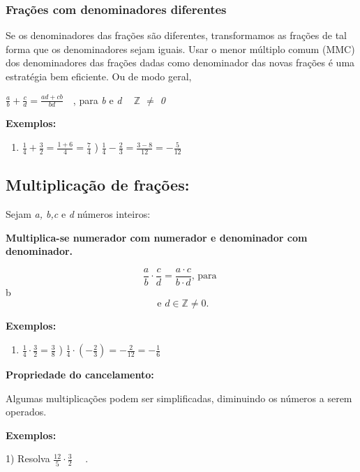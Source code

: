 \subsubsection{Frações com denominadores diferentes}

Se os denominadores das frações são diferentes, transformamos as frações de tal forma que os denominadores sejam iguais. Usar o menor múltiplo comum (MMC) dos denominadores das frações dadas como denominador das novas frações é uma estratégia bem eficiente. Ou de modo geral, 

\quad  \( \frac{a}{b}+\frac{c}{d}=\frac{ad+cb}{bd}~~~ \) {  , para \textit{b }e\textit{ d  ~  \( \mathbb{Z} \)   $ \neq $  0} \qedsymbol{}}

\textbf{Exemplos:}

\begin{enumerate}
	\item  \( \frac{1}{4}+\frac{3}{2}=\frac{1+6}{4}=\frac{7}{4} \) \quad \quad {}){   \( \frac{1}{4}-\frac{2}{3}=\frac{3-8}{12}=-\frac{5}{12} \) }
\end{enumerate}

\subsection{Multiplicação de frações:}

Sejam \textit{a, b,c} e \textit{d} números inteiros: 

\begin{caixa}
\textbf{Multiplica-se numerador com numerador e denominador com denominador. }

$$ \frac{a}{b} \cdot \frac{c}{d}=\frac{a \cdot c }{b \cdot d}\textrm{,  para }$$ b $$\textrm{ e } d \in \mathbb{Z} \neq 0 \textrm{.}$$
\end{caixa}
\textbf{Exemplos:}

\begin{enumerate}
	\item  \( \frac{1}{4} \cdot \frac{3}{2}=\frac{3}{8} \) \quad \quad {}){   \( \frac{1}{4} \cdot  \left( -\frac{2}{3} \right) =-\frac{2}{12}=-\frac{1}{6} \) }
\end{enumerate}

\textbf{Propriedade do cancelamento:}

Algumas multiplicações podem ser simplificadas, diminuindo os números a serem operados.

\textbf{Exemplos: }

1) Resolva \( \frac{12}{5} \cdot \frac{3}{2}\text{~~~ .} \) 

